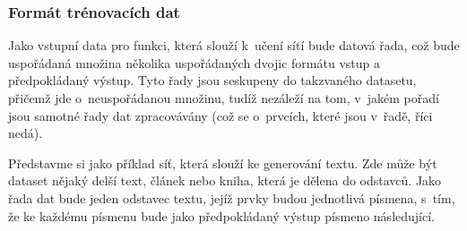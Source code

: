 \documentclass[a4paper]{article}
\begin{document}
\subsubsection{Formát trénovacích dat}
Jako vstupní data pro funkci, která slouží k~učení sítí bude datová řada, což bude uspořádaná množina několika uspořádaných dvojic formátu vstup a předpokládaný výstup. Tyto řady jsou seskupeny do takzvaného datasetu, přičemž jde o~neuspořádanou množinu, tudíž nezáleží na tom, v~jakém pořadí jsou samotné řady dat zpracovávány (což se o~prvcích, které jsou v~řadě, říci nedá).\par
Představme si jako příklad síť, která slouží ke generování textu. Zde může být dataset nějaký delší text, článek nebo kniha, která je dělena do odstavců. Jako řada dat bude jeden odstavec textu, jejíž prvky budou jednotlivá písmena, s~tím, že ke každému písmenu bude jako předpokládaný výstup písmeno následující.
\end{document}
